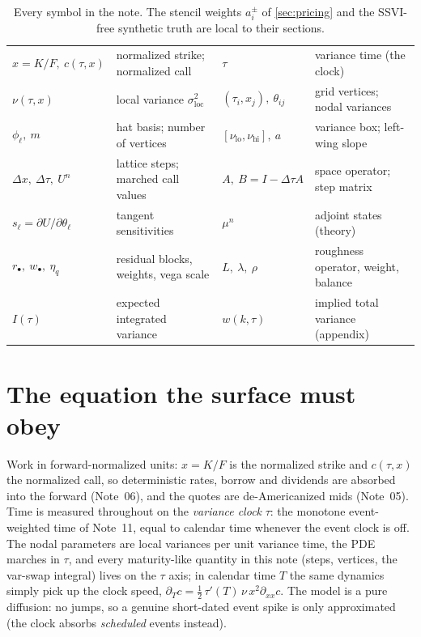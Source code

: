 \documentclass[11pt]{article}
\begin{document}
\begin{table}[H]
\centering\footnotesize
\setlength{\tabcolsep}{4pt}
\begin{tabular}{@{}llll@{}}
\toprule
$x=K/F,\ c(\tau,x)$ & normalized strike; normalized call &
$\tau$ & variance time (the clock)\\[2pt]
$\nu(\tau,x)$ & local variance $\sigma_{\text{loc}}^{2}$ &
$(\tau_i,x_j),\ \theta_{ij}$ & grid vertices; nodal variances\\[2pt]
$\phi_\ell,\ m$ & hat basis; number of vertices &
$[\nu_{\mathrm{lo}},\nu_{\mathrm{hi}}],\ a$ & variance box; left-wing slope\\[2pt]
$\Delta x,\ \Delta\tau,\ U^{n}$ & lattice steps; marched call values &
$A,\ B=I-\Delta\tau A$ & space operator; step matrix\\[2pt]
$s_\ell=\partial U/\partial\theta_\ell$ & tangent sensitivities &
$\mu^{n}$ & adjoint states (theory)\\[2pt]
$r_{\bullet},\ w_{\bullet},\ \eta_q$ & residual blocks, weights, vega scale &
$L,\ \lambda,\ \rho$ & roughness operator, weight, balance\\[2pt]
$I(\tau)$ & expected integrated variance &
$w(k,\tau)$ & implied total variance (appendix)\\
\bottomrule
\end{tabular}
\caption{Every symbol in the note.  The stencil weights $a^{\pm}_i$ of
\cref{sec:pricing} and the SSVI-free synthetic truth are local to their
sections.}
\label{tab:ledger}
\end{table}

\section{The equation the surface must obey}
\label{sec:dupire}

\begin{assumption}
\label{ass:units}
Work in forward-normalized units: $x=K/F$ is the normalized strike and
$c(\tau,x)$ the normalized call, so deterministic rates, borrow and
dividends are absorbed into the forward (Note~06), and the quotes are
de-Americanized mids (Note~05).  Time is measured throughout on the
\emph{variance clock} $\tau$: the monotone event-weighted time of Note~11,
equal to calendar time whenever the event clock is off.  The nodal
parameters are local variances per unit variance time, the PDE marches in
$\tau$, and every maturity-like quantity in this note (steps, vertices, the
var-swap integral) lives on the $\tau$ axis; in calendar time $T$ the same
dynamics simply pick up the clock speed,
$\partial_{T}c=\tfrac12\,\tau'(T)\,\nu\,x^{2}\partial_{xx}c$.  The model is
a pure diffusion: no jumps, so a genuine short-dated event spike is only
approximated (the clock absorbs \emph{scheduled} events instead).
\end{assumption}
\end{document}
